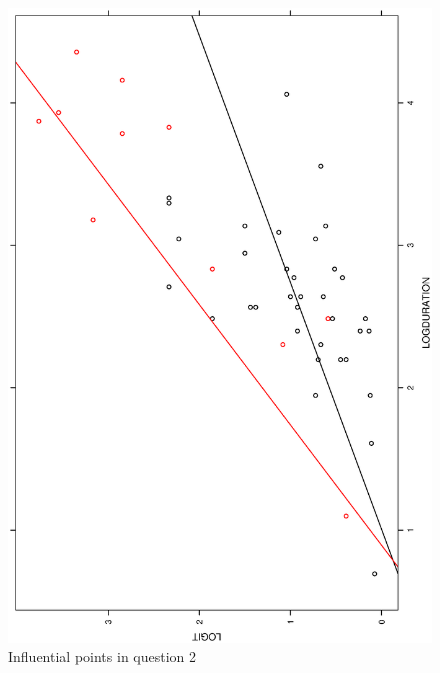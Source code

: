 \documentclass[a4paper,10pt]{article}
\begin{document}
\begin{figure}
\includegraphics[angle=-90, width=1\textwidth]{figures/math650_hw7_fig6.eps}
\caption{Influential points in question 2}\label{f6}
\end{figure}
\end{document}
